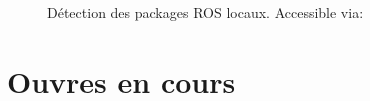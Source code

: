 \begin{figure}
\centering
{}
\caption{Détection des packages ROS locaux. Accessible via: }
\label{fig:ros_settings}
\end{figure}

\section{Ouvres en cours}

